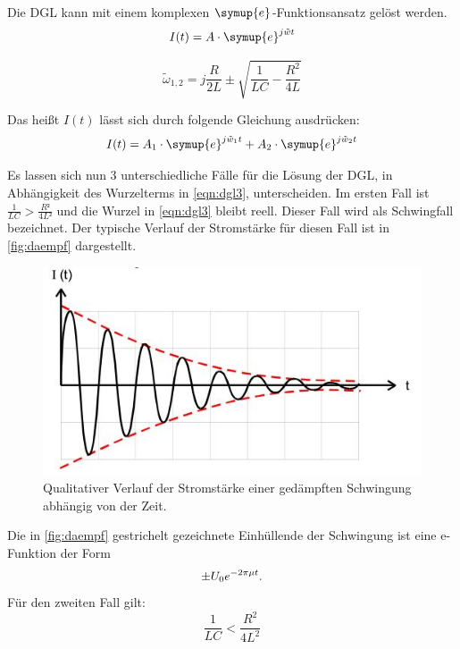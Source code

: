 \noindent Die DGL kann mit einem komplexen $\symup{e}$-Funktionsansatz gelöst werden.
    \begin{equation}
        I(t) = A \cdot \symup{e}^{j \tilde{w} t}
        \label{eqn:dgl2}
    \end{equation}

    \begin{equation}
        \tilde{\omega}_{1,2} = j \frac{R}{2L} \pm \sqrt{\frac{1}{LC}-\frac{R^2}{4L}} 
        \label{eqn:dgl3}
    \end{equation}
    
    \noindent Das heißt $I(t)$ lässt sich durch folgende Gleichung ausdrücken:
    \begin{equation}
        I(t) = A_1 \cdot \symup{e}^{j \tilde{w}_1t} + A_2 \cdot \symup{e}^{j\tilde{w}_2 t} 
    \end{equation}

\noindent Es lassen sich nun 3 unterschiedliche Fälle für die Lösung der DGL, in Abhängigkeit des Wurzelterms in \autoref{eqn:dgl3}, unterscheiden. 
Im ersten Fall ist $\frac{1}{LC} > \frac{R²}{4L²}$ und die Wurzel in \autoref{eqn:dgl3} bleibt reell. Dieser Fall wird als Schwingfall bezeichnet. Der typische Verlauf der Stromstärke für diesen Fall ist in \autoref{fig:daempf} dargestellt.
\begin{figure}[H]
    \centering
    \includegraphics{bilder/daempf.jpg}
    \caption{Qualitativer Verlauf der Stromstärke einer gedämpften Schwingung abhängig von der Zeit. \cite{sample}}
    \label{fig:daempf}
  \end{figure}
\noindent
Die in \autoref{fig:daempf} gestrichelt gezeichnete Einhüllende der Schwingung ist eine e-Funktion der Form
\begin{equation*}
    \pm U_0 e^{-2\pi\mu t} \\ \text{.}
    \label{eqn:einh}
\end{equation*}
\noindent
Für den zweiten Fall gilt:
\begin{equation}
    \frac{1}{LC} < \frac{R^2}{4L^2} 
\end{equation}

